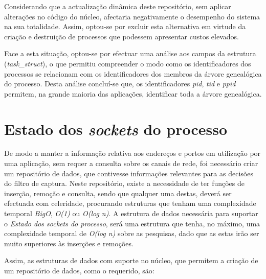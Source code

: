 Considerando que a actualização dinâmica deste repositório, sem aplicar alterações no código do núcleo, afectaria negativamente o desempenho do sistema na sua totalidade.
Assim, optou-se por excluir esta alternativa em virtude da criação e destruição de processos que podessem apresentar custos elevados.


Face a esta situação, optou-se por efectuar uma análise aos campos da estrutura (\textit{task\_struct}), o que permitiu compreender o modo como os identificadores dos processos se relacionam com os identificadores dos membros da árvore genealógica do processo.
Desta análise concluí-se que, os identificadores \textit{pid}, \textit{tid} e \textit{ppid} permitem, na grande maioria das aplicações, identificar toda a árvore genealógica.





\section{Estado dos \textit{sockets} do processo}

De modo a manter a informação relativa aos endereços e portos em utilização por uma aplicação, sem requer a consulta sobre os canais de rede, foi necessário criar um repositório de dados, que contivesse informações relevantes para as decisões do filtro de captura.
Neste repositório, existe a necessidade de ter funções de inserção, remoção e consulta, sendo que qualquer uma destas, deverá ser efectuada com celeridade, procurando estruturas que tenham uma complexidade temporal \textit{BigO}, \textit{O(1)} ou \textit{O(log n)}.
A estrutura de dados necessária para suportar o \textit{Estado dos sockets do processo}, será uma estrutura que tenha, no máximo, uma complexidade temporal de \textit{O(log n)} sobre as pesquisas, dado que as estas irão ser muito superiores às inserções e remoções.

Assim, as estruturas de dados com suporte no núcleo, que permitem a criação de um repositório de dados, como o requerido, são:


